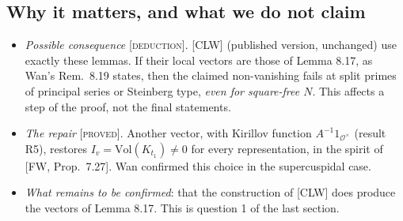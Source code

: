\documentclass[11pt]{amsart}
\newcommand{\cO}{\mathcal{O}}
\newcommand{\stat}[1]{\textsc{[#1]}}
\newcommand{\Vol}{\mathrm{Vol}}
\begin{document}
\subsection*{Why it matters, and what we do not claim}
\begin{itemize}
\item \emph{Possible consequence} \stat{deduction}. [CLW] (published version, unchanged) use exactly these lemmas. If their local vectors are those of Lemma 8.17, as Wan's Rem.~8.19 states, then the claimed non-vanishing fails at split primes of principal series or Steinberg type, \emph{even for square-free $N$}. This affects a step of the proof, not the final statements.
\item \emph{The repair} \stat{proved}. Another vector, with Kirillov function $A^{-1}1_{\cO^\times}$ (result R5), restores $I_v=\Vol(K_{t_1})\neq0$ for every representation, in the spirit of [FW, Prop.~7.27]. Wan confirmed this choice in the supercuspidal case.
\item \emph{What remains to be confirmed}: that the construction of [CLW] does produce the vectors of Lemma 8.17. This is question 1 of the last section.
\end{itemize}
\end{document}
